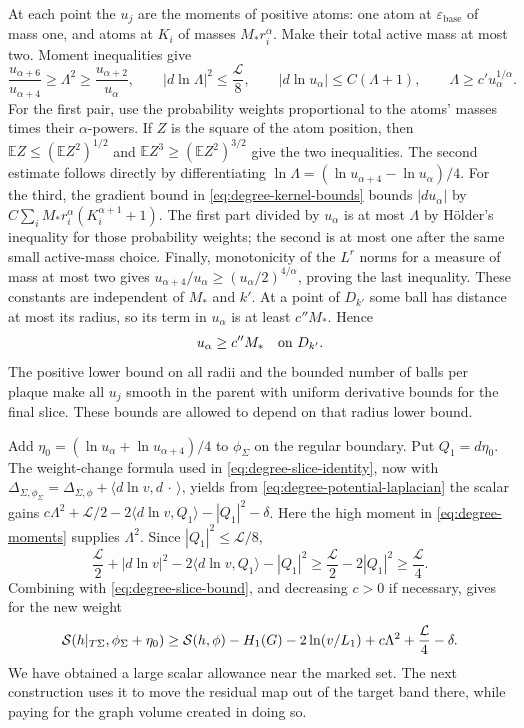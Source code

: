 At each point the $u_j$ are the moments of positive atoms: one atom at
$\varepsilon_{\mathrm{base}}$ of mass one, and atoms at $K_i$ of masses
$M_*r_i^\alpha$.
Make their total active mass at most two.  Moment inequalities give
\begin{equation}\label{eq:degree-moments}
 \frac{u_{\alpha+6}}{u_{\alpha+4}}\ge\Lambda^2
     \ge\frac{u_{\alpha+2}}{u_\alpha},\qquad
 |d\ln\Lambda|^2\le\frac{\mathcal L}{8},\qquad
 |d\ln u_\alpha|\le C(\Lambda+1),\qquad
 \Lambda\ge c' u_\alpha^{1/\alpha}.
\end{equation}
For the first pair, use the probability weights proportional to the
atoms' masses times their $\alpha$-powers.  If $Z$ is the square of the
atom position, then
$\mathbb E Z\le(\mathbb E Z^2)^{1/2}$ and
$\mathbb E Z^3\ge(\mathbb E Z^2)^{3/2}$ give the two inequalities.  The
second estimate follows directly by differentiating
$\ln\Lambda=(\ln u_{\alpha+4}-\ln u_\alpha)/4$.  For the third, the
gradient bound in \eqref{eq:degree-kernel-bounds} bounds
$|du_\alpha|$ by $C\sum_iM_*r_i^\alpha(K_i^{\alpha+1}+1)$.
The first part divided by $u_\alpha$ is at most $\Lambda$ by H\"older's
inequality for those probability weights; the second is at most one after
the same small active-mass choice.  Finally, monotonicity of the
$L^r$ norms for a measure of mass at most two gives
$u_{\alpha+4}/u_\alpha\ge(u_\alpha/2)^{4/\alpha}$, proving the last
inequality.  These constants are independent of $M_*$ and $k'$.
At a point of $D_{k'}$ some ball has distance at most its radius, so its
term in $u_\alpha$ is at least $c''M_*$.  Hence
\begin{equation}\label{eq:degree-potential-on-bad}
                        u_\alpha\ge c''M_*\quad\hbox{on }D_{k'}.
\end{equation}
The positive lower bound on all radii and the bounded number of balls per
plaque make all $u_j$ smooth in the parent with uniform derivative bounds
for the final slice.  These bounds are allowed to depend on that radius
lower bound.

Add $\eta_0=(\ln u_\alpha+\ln u_{\alpha+4})/4$ to $\phi_\Sigma$ on the
regular boundary.  Put $Q_1=d\eta_0$.  The weight-change formula used in
\eqref{eq:degree-slice-identity}, now with
$\Delta_{\Sigma,\phi_\Sigma}=\Delta_{\Sigma,\phi}
+\langle d\ln v,d\,\cdot\,\rangle$, yields from
\eqref{eq:degree-potential-laplacian} the scalar gains
$c\Lambda^2+\mathcal L/2-2\langle d\ln v,Q_1\rangle-|Q_1|^2-\delta$.
Here the high moment in \eqref{eq:degree-moments} supplies $\Lambda^2$.
Since $|Q_1|^2\le\mathcal L/8$,
\[
 \frac{\mathcal L}{2}+|d\ln v|^2
       -2\langle d\ln v,Q_1\rangle-|Q_1|^2
       \ge\frac{\mathcal L}{2}-2|Q_1|^2\ge\frac{\mathcal L}{4}.
\]
Combining with \eqref{eq:degree-slice-bound}, and decreasing $c>0$ if
necessary, gives for the new weight
\begin{equation}\label{eq:degree-weight-gain}
 \mathcal S(h|_{T\Sigma},\phi_\Sigma+\eta_0)
 \ge\mathcal S(h,\phi)-H_1(G)-2\ln(v/L_1)
                         +c\Lambda^2+\frac{\mathcal L}{4}-\delta.
\end{equation}
We have obtained a large scalar allowance near the marked set.  The next
construction uses it to move the residual map out of the target band
there, while paying for the graph volume created in doing so.

